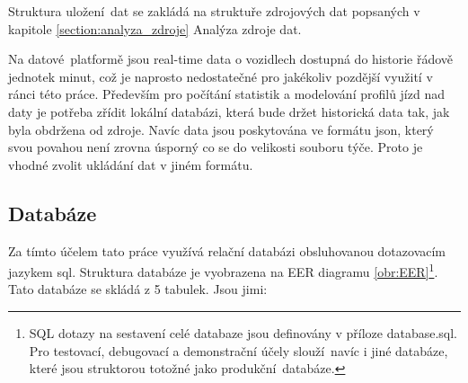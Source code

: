 Struktura uložení dat se zakládá na struktuře zdrojových dat popsaných v kapitole \ref{section:analyza_zdroje} Analýza zdroje dat.

\bigbreak

Na datové platformě jsou real-time data o vozidlech dostupná do historie řádově jednotek minut, což je naprosto nedostatečné pro jakékoliv pozdější využití v ránci této práce. Především pro počítání statistik a modelování profilů jízd nad daty je potřeba zřídit lokální databázi, která bude držet historická data tak, jak byla obdržena od zdroje. Navíc data jsou poskytována ve formátu \gls{json}, který svou povahou není zrovna úsporný co se do velikosti souboru týče. Proto je vhodné zvolit ukládání dat v jiném formátu.

\subsection{Databáze} \label{subsection:databaze}

Za tímto účelem tato práce využívá relační databázi obsluhovanou dotazovacím jazykem \gls{sql}. Struktura databáze je vyobrazena na EER diagramu \ref{obr:EER}\footnote{SQL dotazy na sestavení celé databaze jsou definovány v příloze database.sql. Pro testovací, debugovací a demonstrační účely slouží navíc i jiné databáze, které jsou struktorou totožné jako produkční databáze.}. Tato databáze se skládá z 5 tabulek. Jsou jimi:


